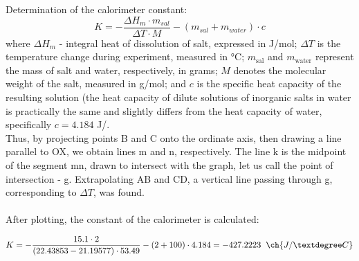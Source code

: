 \documentclass[12pt, letterpaper]{article}
\begin{document}
        
     Determination of the calorimeter constant:
    \begin{equation}
       K = -\frac{\Delta H_m \cdot m_{sal}}{ \Delta T \cdot M} - \left(m_{sal} + m_{water}\right) \cdot c 
    \end{equation}
        where $\Delta H_m$ - integral heat of dissolution of salt, expressed in J/mol;
        $\Delta T$ is the temperature change during experiment, measured in °C; 
        $m_{\text{sal}}$ and $m_{\text{water}}$ represent the mass of salt and water, respectively, in grams; 
        $M$ denotes the molecular weight of the salt, measured in g/mol; 
        and $c$ is the specific heat capacity of the resulting solution
        (the heat capacity of dilute solutions of inorganic salts in water is practically the same and slightly differs from the heat capacity of water, specifically $c = 4.184$ J/. \\ 
        
        Thus, by projecting points B and C onto the ordinate axis, then drawing a line parallel to OX, we obtain lines m and n, respectively. The line k is the midpoint of the segment mn, drawn to intersect with the graph, let us call the point of intersection - g. Extrapolating AB and CD, a vertical line passing through g, corresponding to $\Delta T$, was found. \\  \\     
        After plotting, the constant of the calorimeter is calculated:
    
    \begin{equation}
       K = -\frac{15.1 \cdot 2}{ (22.43853 - 21.19577) \cdot 53.49} - \left(2 + 100\right) \cdot 4.184  = -427.2223 \hspace{2 mm} \ch{J/°C}
    \end{equation}



        
\end{document}
